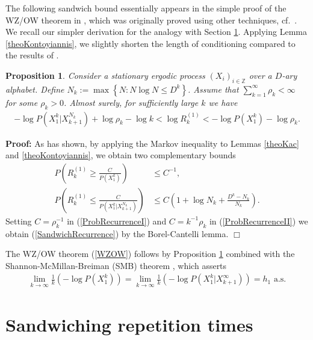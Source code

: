\documentclass[a4paper,12pt]{article}
\newcommand{\okra}[1]{\left( #1 \right)}
\newcommand{\klam}[1]{\left\{ #1 \right\}}
\newtheorem{proposition}{Proposition}
\newenvironment*{proof}{\begin{trivlist}\item[]
\noindent\textbf{Proof:}}{$\Box$\par\end{trivlist}}
\begin{document}
The following sandwich bound essentially appears in the simple proof
of the WZ/OW theorem in \citep[Theorem 9.12]{Debowski21}, which was
originally proved using other techniques, cf.\
\citep{WynerZiv89,OrnsteinWeiss93}. We recall our simpler derivation
for the analogy with Section \ref{secRepetition}. Applying Lemma
\ref{theoKontoyiannis}, we slightly shorten the length of conditioning
compared to the results of \citep{Debowski18b}.
\begin{proposition}
  \label{theoSandwichRecurrence}
  Consider a stationary ergodic process $(X_i)_{i\in\mathbb{Z}}$ over
  a $D$-ary alphabet. Define $N_k:=\max\klam{N: N\log N\le D^k}$.
  Assume that $\sum_{k=1}^\infty \rho_k<\infty$ for some $\rho_k>0$.
  Almost surely, for sufficiently large $k$ we have
\begin{align}
  \label{SandwichRecurrence}
  -\log P(X_1^k|X_{k+1}^{N_k})
  +\log \rho_k-\log k
  <
  \log R^{(1)}_k
  <
  -\log P(X_1^k)
  -\log \rho_k
  .
\end{align}
\end{proposition}
\begin{proof}
  As \citet{Kontoyiannis98} has shown, by applying the Markov
  inequality to Lemmas \ref{theoKac} and \ref{theoKontoyiannis}, we
  obtain two complementary bounds
\begin{align}
  \label{ProbRecurrenceI}
  P\okra{R^{(1)}_k\ge \frac{C}{P(X_1^k)}}
  &\le C^{-1}
  ,
  \\
  \label{ProbRecurrenceII}
  P\okra{R^{(1)}_k\le \frac{C}{P(X_1^k|X_{k+1}^{N_k})}}
  &\le C\okra{1+\log N_k+\frac{D^k-N_k}{N_k}}
  .
\end{align}
Setting $C=\rho_k^{-1}$ in (\ref{ProbRecurrenceI}) and $C=k^{-1}\rho_k$ in
(\ref{ProbRecurrenceII}) we obtain (\ref{SandwichRecurrence}) by the
Borel-Cantelli lemma.
\end{proof}

The WZ/OW theorem (\ref{WZOW}) follows by Proposition
\ref{theoSandwichRecurrence} combined with the
Shannon-McMillan-Breiman (SMB) theorem \citep{Shannon48, Breiman57,
  Chung61, Barron85, AlgoetCover88}, which asserts
\begin{align}
  \label{SMB}
  \lim_{k\to\infty}
  \frac{1}{k}\okra{-\log P(X_1^k)}=
  \lim_{k\to\infty}
  \frac{1}{k}\okra{-\log P(X_1^k|X_{k+1}^\infty)}=
  h_1 \text{ a.s.}
\end{align}

\section{Sandwiching repetition times}
\label{secRepetition}
\end{document}
